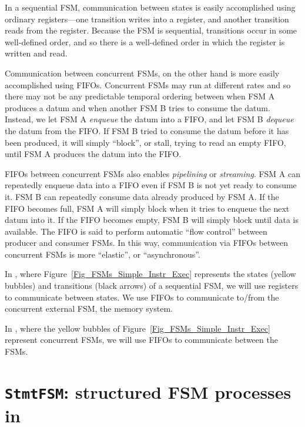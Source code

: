 In a sequential FSM, communication between states is easily
accomplished using ordinary registers---one transition writes into a
register, and another transition reads from the register.  Because the
FSM is sequential, transitions occur in some well-defined order, and
so there is a well-defined order in which the register is written and
read.

Communication between concurrent FSMs, on the other hand is more
easily accomplished using FIFOs.  Concurrent FSMs may run at different
rates and so there may not be any predictable temporal ordering
between when FSM A produces a datum and when another FSM B tries to
consume the datum.  Instead, we let FSM A \emph{enqueue} the datum
into a FIFO, and let FSM B \emph{dequeue} the datum from the FIFO.  If
FSM B tried to consume the datum before it has been produced, it will
simply ``block'', or stall, trying to read an empty FIFO, until FSM A
produces the datum into the FIFO.

FIFOs between concurrent FSMs also enables \emph{pipelining} or
\emph{streaming}.  FSM A can repeatedly enqueue data into a FIFO even
if FSM B is not yet ready to consume it.  FSM B can repeatedly consume
data already produced by FSM A.  If the FIFO becomes full, FSM A will
simply block when it tries to enqueue the next datum into it.  If the
FIFO becomes empty, FSM B will simply block until data is available.
The FIFO is said to perform automatic ``flow control'' between
producer and consumer FSMs.  In this way, communication via FIFOs
between concurrent FSMs is more ``elastic'', or ``asynchronous''.

In {\DRUM}, where Figure~\ref{Fig_FSMs_Simple_Instr_Exec} represents
the states (yellow bubbles) and transitions (black arrows) of a
sequential FSM, we will use registers to communicate between states.
We use FIFOs to communicate to/from the concurrent external FSM, the
memory system.

In {\FIFE}, where the yellow bubbles of
Figure~\ref{Fig_FSMs_Simple_Instr_Exec} represent concurrent FSMs, we
will use FIFOs to communicate between the FSMs.


\section{{\tt StmtFSM}: structured FSM processes in {\BSV}}

\label{Sec_Rules_StmtFSM}
\label{Sec_StmtFSM}

